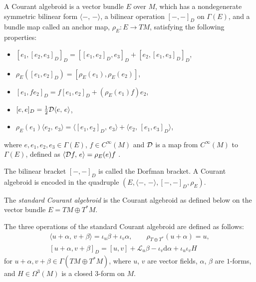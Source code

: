 \documentclass[pdftex]{sigma}
\numberwithin{equation}{section}
\newcommand{\calL}{{\mathcal L}}
\newcommand{\courant}[2]{{[{{#1},{#2}}]_D}}
\newcommand{\rhoe}{\rho_E}
\newcommand{\rhott}{\rho_{T \oplus T^*}}
\newcommand{\bracket}[2]{\langle #1,\,#2\rangle}
\newcommand{\rd}{\mathrm{d}}
\begin{document}
\begin{Definition}\label{courantdefinition}
A Courant algebroid is a vector bundle $E$ over $M$,
which has a nondegenerate symmetric bilinear form
$\bracket{-}{-}$, a bilinear operation $\courant{-}{-}$ on $\Gamma(E)$,
and a bundle map called an anchor map,
$\rhoe\colon E \longrightarrow TM$, satisfying the following properties:
\begin{itemize}\itemsep=0pt%
\item[(1)] $\courant{e_1}{\courant{e_2}{e_3}} = \courant{\courant{e_1}{e_2}}{e_3} + \courant{e_2}{\courant{e_1}{e_3}}$,
\item[(2)] $\rhoe(\courant{e_1}{e_2}) = [\rhoe(e_1), \rhoe(e_2)]$,
\item[(3)] $\courant{e_1}{f e_2} = f \courant{e_1}{e_2}
+ (\rhoe(e_1)f)e_2$,
\item[(4)] $\courant{e}{e} = \frac{1}{2} {\cal D} \bracket{e}{e}$,
\item[(5)] $\rhoe(e_1) \bracket{e_2}{e_3}
= \bracket{\courant{e_1}{e_2}}{e_3} + \bracket{e_2}{\courant{e_1}{e_3}}$,
\end{itemize}
where
$e, e_1, e_2, e_3 \in \Gamma(E)$, $f \in C^{\infty}(M)$ and
${\cal D}$ is a map from $C^{\infty}(M)$ to $\Gamma (E)$,
defined as
$\bracket{{\cal D}f}{e} = \rhoe(e) f$
\cite{LWX}.
\end{Definition}
The bilinear bracket $\courant{-}{-}$ is called the Dorfman bracket.
A Courant algebroid is encoded in the quadruple $(E, \bracket{-}{-}, \courant{-}{-}, \rhoe)$.

\begin{Example}\label{standardCA}
The \emph{standard Courant algebroid} is the Courant algebroid
as defined below on the vector bundle $E = TM \oplus T^*M$.

The three operations of the standard Courant algebroid
are defined as follows:
\begin{gather*}
	\bracket{u + \alpha}{v + \beta} = \iota_u \beta + \iota_v \alpha,\qquad
\rhott(u+\alpha) = u, \\
\courant{u + \alpha}{v + \beta} = [u, v] + \calL_u \beta - \iota_v \rd \alpha + \iota_u \iota_v H
\end{gather*}
for $u + \alpha, v + \beta \in \Gamma(TM \oplus T^*M)$,
where $u$, $v$ are vector fields, $\alpha$, $\beta$ are $1$-forms,
and $H \in \Omega^3(M)$ is a closed $3$-form on $M$.
\end{Example}
\end{document}

